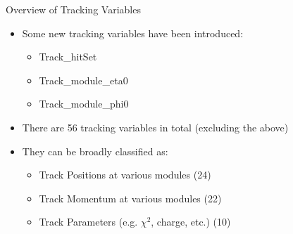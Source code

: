 \begin{frame}{Overview of Tracking Variables}
    \begin{itemize}
        \item Some new tracking variables have been introduced:
              \begin{itemize}
                  \item Track\_hitSet
                  \item Track\_module\_eta0
                  \item Track\_module\_phi0
              \end{itemize}
        \item There are 56 tracking variables in total (excluding the above)
        \item They can be broadly classified as:
              \begin{itemize}
                  \item Track Positions at various modules (24)
                  \item Track Momentum at various modules (22)
                  \item Track Parameters (e.g. $\chi^2$, charge, etc.) (10)
              \end{itemize}
    \end{itemize}

\end{frame}